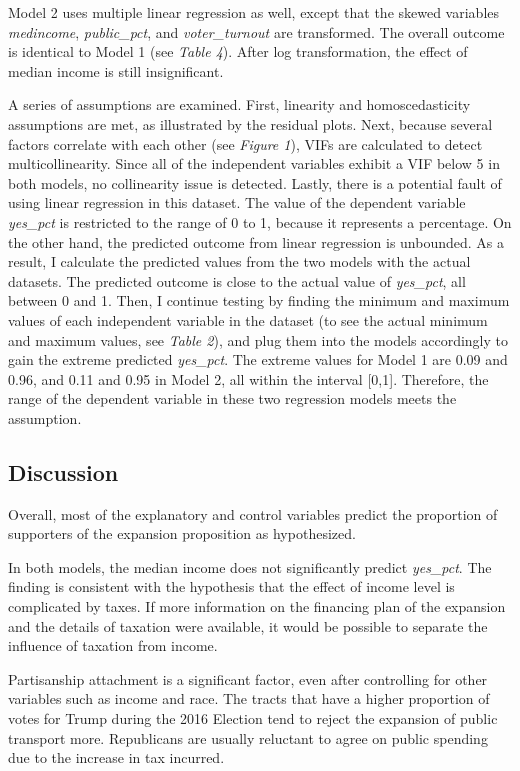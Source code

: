 \documentclass[
]{article}
\begin{document}
Model 2 uses multiple linear regression as well, except that the skewed
variables \emph{medincome}, \emph{public\_pct}, and
\emph{voter\_turnout} are transformed. The overall outcome is identical
to Model 1 (see \emph{Table 4}). After log transformation, the effect of
median income is still insignificant.

A series of assumptions are examined. First, linearity and
homoscedasticity assumptions are met, as illustrated by the residual
plots. Next, because several factors correlate with each other (see
\emph{Figure 1}), VIFs are calculated to detect multicollinearity. Since
all of the independent variables exhibit a VIF below 5 in both models,
no collinearity issue is detected. Lastly, there is a potential fault of
using linear regression in this dataset. The value of the dependent
variable \emph{yes\_pct} is restricted to the range of 0 to 1, because
it represents a percentage. On the other hand, the predicted outcome
from linear regression is unbounded. As a result, I calculate the
predicted values from the two models with the actual datasets. The
predicted outcome is close to the actual value of \emph{yes\_pct}, all
between 0 and 1. Then, I continue testing by finding the minimum and
maximum values of each independent variable in the dataset (to see the
actual minimum and maximum values, see \emph{Table 2}), and plug them
into the models accordingly to gain the extreme predicted
\emph{yes\_pct}. The extreme values for Model 1 are 0.09 and 0.96, and
0.11 and 0.95 in Model 2, all within the interval {[}0,1{]}. Therefore,
the range of the dependent variable in these two regression models meets
the assumption.

\hypertarget{discussion}{%
\subsection{Discussion}\label{discussion}}

Overall, most of the explanatory and control variables predict the
proportion of supporters of the expansion proposition as hypothesized.

In both models, the median income does not significantly predict
\emph{yes\_pct}. The finding is consistent with the hypothesis that the
effect of income level is complicated by taxes. If more information on
the financing plan of the expansion and the details of taxation were
available, it would be possible to separate the influence of taxation
from income.

Partisanship attachment is a significant factor, even after controlling
for other variables such as income and race. The tracts that have a
higher proportion of votes for Trump during the 2016 Election tend to
reject the expansion of public transport more. Republicans are usually
reluctant to agree on public spending due to the increase in tax
incurred.
\end{document}
